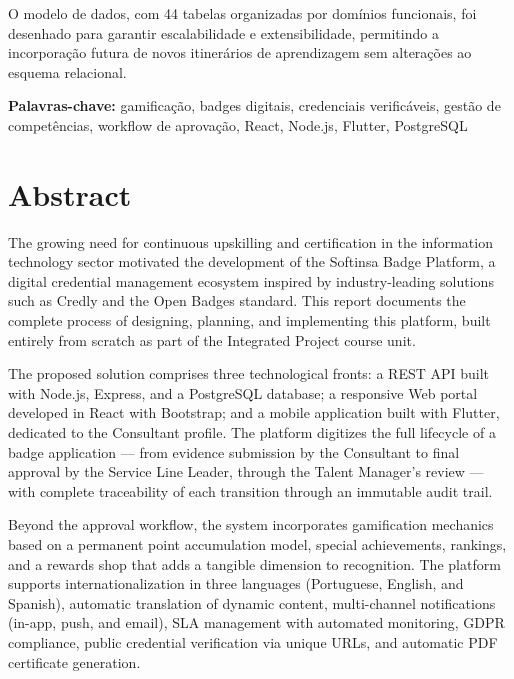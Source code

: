 \documentclass[12pt,a4paper]{report}
\begin{document}
O modelo de dados, com 44 tabelas organizadas por domínios funcionais, foi desenhado para garantir escalabilidade e extensibilidade, permitindo a incorporação futura de novos itinerários de aprendizagem sem alterações ao esquema relacional.

\vspace{1cm}
\noindent\textbf{Palavras-chave:} gamificação, badges digitais, credenciais verificáveis, gestão de competências, workflow de aprovação, React, Node.js, Flutter, PostgreSQL

\newpage

\chapter*{Abstract}

The growing need for continuous upskilling and certification in the information technology sector motivated the development of the Softinsa Badge Platform, a digital credential management ecosystem inspired by industry-leading solutions such as Credly and the Open Badges standard. This report documents the complete process of designing, planning, and implementing this platform, built entirely from scratch as part of the Integrated Project course unit.

The proposed solution comprises three technological fronts: a REST API built with Node.js, Express, and a PostgreSQL database; a responsive Web portal developed in React with Bootstrap; and a mobile application built with Flutter, dedicated to the Consultant profile. The platform digitizes the full lifecycle of a badge application --- from evidence submission by the Consultant to final approval by the Service Line Leader, through the Talent Manager's review --- with complete traceability of each transition through an immutable audit trail.

Beyond the approval workflow, the system incorporates gamification mechanics based on a permanent point accumulation model, special achievements, rankings, and a rewards shop that adds a tangible dimension to recognition. The platform supports internationalization in three languages (Portuguese, English, and Spanish), automatic translation of dynamic content, multi-channel notifications (in-app, push, and email), SLA management with automated monitoring, GDPR compliance, public credential verification via unique URLs, and automatic PDF certificate generation.
\end{document}
